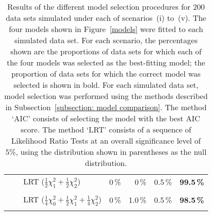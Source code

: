 \documentclass[11pt]{article}
\begin{document}
\begin{table}[!b]
\begin{center}
{\begin{tabular}{|c|c|l|rrrr|}
            &                       & LRT ($\frac{1}{2} \chi^2_1 +\frac{1}{2} \chi^2_2$)                                    & 0\,\% &0\,\% & 0.5\,\% & {\bf 99.5\,\%} \\
\vspace*{-3mm} & & & & & &  \\
            &                       & LRT ($\frac{1}{4} \chi^2_0 +\frac{1}{2} \chi^2_1 +\frac{1}{4} \chi^2_2$)  & 0\,\% &1.0\,\% & 0.5\,\% & {\bf 98.5\,\%} \\
 & & & & & &  \\
 \hline
\end{tabular}}
\end{center}
\caption*{Results of the different model selection procedures for 200 data sets simulated under each of scenarios~(i) to~(v). The four models shown in Figure~\ref{models} were fitted to each simulated data set. For each scenario, the percentages shown are the proportions of data sets for which each of the four models was selected as the best-fitting model; the proportion of data sets for which the correct model was selected is shown in bold. For each simulated data set, model selection was performed using the methods described in Subsection~\ref{subsection: model comparison}. The method `AIC' consists of selecting the model with the best AIC score. The method `LRT' consists of a sequence of Likelihood Ratio Tests at an overall significance level of 5\%, using the distribution shown in parentheses as the null distribution. 
}
\end{table}
\end{document}
